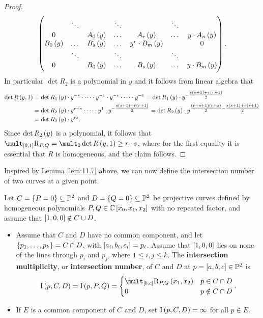 \begin{proof}
$$\begin{pmatrix}
& \ddots & & \ddots & & \ddots & \\
0 & & A_0\br{y} & \dots & A_r\br{y} & \dots & y \cdot A_n\br{y} \\
B_0\br{y} & \dots & B_s\br{y} & \dots & y^r \cdot B_m\br{y} & & 0 \\
& \ddots & & \ddots & & \ddots & \\
0 & & B_0\br{y} & \dots & B_s\br{y} & \dots & y \cdot B_m\br{y}
\end{pmatrix}.
$$
In particular $ \det R_2 $ is a polynomial in $ y $ and it follows from linear algebra that
\begin{align*}
\det R\br{y, 1}
& = \det R_1\br{y} \cdot y^{-s} \cdot \dots \cdot y^{-1} \cdot y^{-r} \cdot \dots \cdot y^{-1}
= \det R_1\br{y} \cdot y^{-\tfrac{s\br{s + 1}+r\br{r + 1}}{2}} \\
& = \det R_2\br{y} \cdot y^{r + s} \cdot \dots \cdot y^1 \cdot y^{-\tfrac{s\br{s + 1} + r\br{r + 1}}{2}}
= \det R_2\br{y} \cdot y^{\tfrac{\br{r + s + 1}\br{r + s}}{2} - \tfrac{s\br{s + 1}+r\br{r + 1}}{2}} \\
& = \det R_2\br{y} \cdot y^{rs}.
\end{align*}
Since $ \det R_2\br{y} $ is a polynomial, it follows that $ \mult_{\sbr{0, 1}} \R_{P, Q} = \mult_0 \det R\br{y, 1} \ge r \cdot s $, where for the first equality it is essential that $ R $ is homogeneous, and the claim follows.
\end{proof}

Inspired by Lemma \ref{lem:11.7} above, we can now define the intersection number of two curves at a given point.

\begin{definition}
\label{def:11.8}
Let $ C = \cbr{P = 0} \subseteq \PP^2 $ and $ D = \cbr{Q = 0} \subseteq \PP^2 $ be projective curves defined by homogeneous polynomials $ P, Q \in \CC\sbr{x_0, x_1, x_2} $ with no repeated factor, and assume that $ \sbr{1, 0, 0} \notin C \cup D $.
\begin{itemize}
\item Assume that $ C $ and $ D $ have no common component, and let $ \cbr{p_1, \dots, p_k} = C \cap D $, with $ \sbr{a_i, b_i, c_i} = p_i $. Assume that $ \sbr{1, 0, 0} $ lies on none of the lines through $ p_i $ and $ p_j $, where $ 1 \le i, j \le k $. The \textbf{intersection multiplicity}, or \textbf{intersection number}, of $ C $ and $ D $ at $ p = \sbr{a, b, c} \in \PP^2 $ is
$$ \I\br{p, C, D} = \I\br{p, P, Q} =
\begin{cases}
\mult_{\sbr{b, c}} \R_{P, Q}\br{x_1, x_2} & p \in C \cap D \\
0 & p \notin C \cap D
\end{cases}.
$$
\item If $ E $ is a common component of $ C $ and $ D $, set $ \I\br{p, C, D} = \infty $ for all $ p \in E $.
\end{itemize}
\end{definition}

